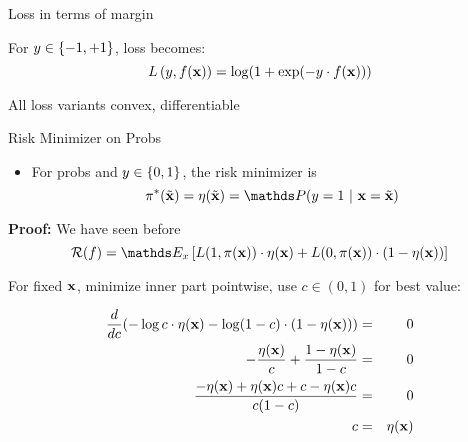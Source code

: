 \documentclass[11pt,compress,t,notes=noshow, xcolor=table]{beamer}
\begin{document}
\begin{framei}[sep=M]{Loss in terms of margin}

\item For $y \in \{-1, +1\}$, loss becomes: 
$$
  L\left(y, f(\mathbf{x})\right) = \log(1+\exp(-y \cdot f(\mathbf{x}))) 
$$
 
\item All loss variants convex, differentiable

 \vfill



\end{framei}


\begin{frame}{Risk Minimizer on Probs}

\begin{itemize}
    \item For probs and $y \in \{0, 1\}$, the risk minimizer is
$$
  \piastxtil = \eta(\xtil) = \P(y = 1 ~|~ \xv = \xtil) 
$$
\end{itemize}


\textbf{Proof:} We have seen before
$$
  \riskf = \E_x \left[L(1, \pix) \cdot \eta(\xv) + L(0, \pix) \cdot (1 - \eta(\xv)) \right]
$$

For fixed $\mathbf{x}$, minimize inner part pointwise, use $c\in(0,1)$ for best value:

{\footnotesize
\begin{eqnarray*}
  \frac{d }{d c} (- \log c  \cdot \eta(\mathbf{x})- \log (1 - c) \cdot (1 - \eta(\mathbf{x}))) &=& 0 \\
  - \frac{\eta(\mathbf{x})}{c} + \frac{1 - \eta(\mathbf{x})}{1 - c} &=& 0 \\
  \frac{- \eta(\mathbf{x}) + \eta(\mathbf{x}) c + c - \eta(\mathbf{x}) c}{c (1 - c)} &=& 0 \\
  c &=& \eta(\mathbf{x})
\end{eqnarray*}
}

\end{frame}
\end{document}
